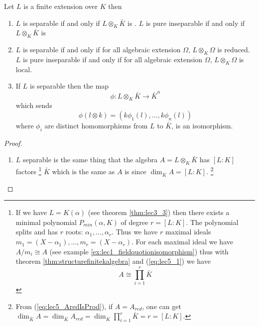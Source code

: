 \begin{theorem}
  Let $L$ is a finite extension over $K$ then
  \begin{enumerate}
  \item $L$ is separable if and only if $L \otimes_K \bar{K}$
    is .
    $L$ is pure inseparable if and only if $L \otimes_K \bar{K}$
    is 
  \item $L$ is separable if and only if for all algebraic extension
    $\Omega$, $L \otimes_K \Omega$ is reduced.
    $L$ is pure inseparable if and only if for all algebraic extension
    $\Omega$, $L \otimes_K \Omega$ is local.
  \item If $L$ is separable then the map
    \[
    \phi: L \otimes_K \bar{K} \to \bar{K}^n
    \]
    which sends
    \[
    \phi\left(l \otimes k\right) =
    \left(
    k \phi_1\left(l\right),
    \dots,
    k \phi_n\left(l\right)
    \right)
    \]
    where $\phi_i$ are distinct homomorphisms from $L$ to $\bar{K}$, 
    is an isomorphism.
  \end{enumerate}
  \begin{proof}
    \begin{enumerate}
    \item $L$ separable is the same thing that the algebra
      $A = L\otimes_K \bar{K}$ has $\left[L:K\right]$ factors
      \footnote{
        If we have $L = K\left(\alpha\right)$
        (see theorem \ref{thm:lec3_3}) then
        there exists a minimal polynomial $P_{min}\left(\alpha,
        K\right)$ of degree $r = \left[L:K\right]$. The polynomial
        splits and has $r$ roots: $\alpha_1, \dots, \alpha_r$. Thus we
        have $r$ maximal ideals
        \(
        m_1 = \left(X - \alpha_1\right), \dots,
        m_r = \left(X - \alpha_r\right)
        \).
        For each maximal ideal we have $A/m_i \cong A$ (see example
        \ref{ex:lec1_fieldquotionisomorphism}) thus with theorem
        \ref{thm:structurefinitekalgebra} and (\ref{eq:lec5_1}) we have
        \[
        A \cong \prod_{i=1}^r \bar{K}
        \]
      }
      $\bar{K}$ which is the same as $A$ is 
      since $\dim_{\bar{K}} A = \left[L:K\right]$.
      \footnote{
        From (\ref{eq:lec5_AredIsProd}), if $A = A_{red}$, one can get
        $\dim_{\bar{K}} A = \dim_{\bar{K}} A_{red} = \dim_{\bar{K}}
        \prod_{i = 1}^r \bar{K} = r = \left[L:K\right]$.
      }


\end{enumerate}
\end{proof}
\end{theorem}
